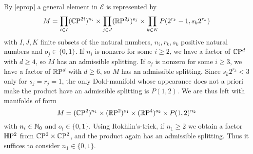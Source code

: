 \prf
By \ref{eprop} a general element in $\mathcal{E}$ is represented by 
\begin{equation*}
    M = \prod\limits_{i\in I} (\mathbb{C}\mathrm{P}^{2i})^{n_i} \times \prod\limits_{j\in J} (\mathbb{R}\mathrm{P}^{2j})^{o_j} \times \prod\limits_{k\in K}{P(2^{r_k} - 1,s_k2^{r_k})}
\end{equation*}
    with $I,J,K$ finite subsets of the natural numbers, $n_i,r_k,s_k$ positive natural numbers and $o_j \in \{0,1\}$.
    If $n_i$ is nonzero for some $i\geq 2$, we have a factor of $\mathbb{C}\mathrm{P}^d$ with $d\geq 4$, so $M$ has an admissible splitting.
    If $o_j$ is nonzero for some $i\geq 3$, we have a factor of $\mathbb{R}\mathrm{P}^d$ with $d\geq 6$, so $M$ has an admissible splitting.
    Since $s_k 2^{r_k} < 3$ only for $s_j = r_j = 1$, the only Dold-manifold whose appearance does not a priori make the product have an admissible splitting is $P(1,2)$.
    We are thus left with manifolds of form
\begin{equation*}
    M = (\mathbb{C}\mathrm{P}^2)^{n_1} \times (\mathbb{R}\mathrm{P}^2)^{o_1} \times (\mathbb{R}\mathrm{P}^4)^{o_2} \times P(1,2)^{n_2}
\end{equation*}
    with $n_i\in \mathbb{N}_0$ and $o_i\in\{0,1\}$.
    Using Rokhlin's-trick, if $n_1\geq 2$ we obtain a factor $\mathbb{H}\mathrm{P}^2$ from $\mathbb{C}\mathrm{P}^2\times\mathbb{C}\mathrm{P}^2$, and the product again has an admissible splitting.
    Thus it suffices to consider $n_1\in \{0,1\}$.
\endprf
